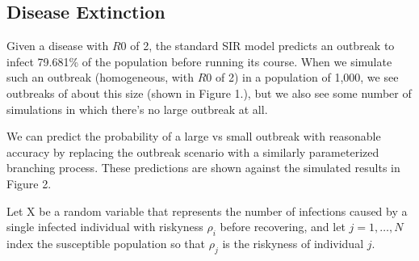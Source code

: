 \documentclass{article}
\begin{document}
\subsection{Disease Extinction}

Given a disease with $R0$ of 2, the standard SIR model predicts an
outbreak to infect 79.681\% of the population before running its course.
When we simulate such an outbreak (homogeneous, with $R0$ of 2) in a population
of 1,000, we see outbreaks of about this size (shown in Figure 1.), 
but we also see some number of simulations in which there's no large outbreak at all.


We can predict the probability of a large vs small outbreak with reasonable
accuracy by replacing the outbreak scenario with a similarly parameterized
branching process. These predictions are shown against the simulated results
in Figure 2.




Let X be a random variable that represents the number of infections caused by
a single infected individual with riskyness $\rho_i$ before recovering, and
let $j = 1, \ldots, N$ index the susceptible population so that $\rho_j$ is the
riskyness of individual $j$.
\end{document}
